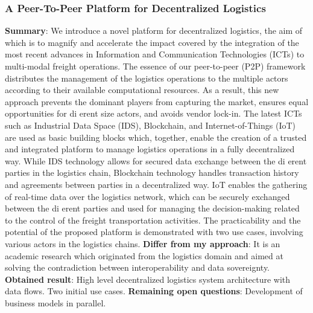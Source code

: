 \subsubsection{A Peer-To-Peer Platform for Decentralized Logistics \cite{peer-to-peerDecentralizedLogistics}}
\textbf{Summary}: We introduce a novel platform for decentralized logistics, the aim of which is to magnify and accelerate the impact covered by the integration of the most recent advances in Information and Communication Technologies (ICTs) to multi-modal freight operations. The essence of our peer-to-peer (P2P) framework distributes the management of the logistics operations to the multiple actors according to their available computational resources. As a result, this new approach prevents the dominant players from capturing the market, ensures equal opportunities for di erent size actors, and avoids vendor lock-in. The latest ICTs such as Industrial Data Space (IDS), Blockchain, and Internet-of-Things (IoT) are used as basic building blocks which, together, enable the creation of a trusted and integrated platform to manage logistics operations in a fully decentralized way. While IDS technology allows for secured data exchange between the di erent parties in the logistics chain, Blockchain technology handles transaction history and agreements between parties in a decentralized way. IoT enables the gathering of real-time data over the logistics network, which can be securely exchanged between the di erent parties and used for managing the decision-making related to the control of the freight transportation activities. The practicability and the potential of the proposed platform is demonstrated with two use cases, involving various actors in the logistics chains.\newline
\textbf{Differ from my approach}: It is an academic research which originated from the logistics domain and aimed at solving the contradiction between interoperability and data sovereignty.\newline
\textbf{Obtained result}: High level decentralized logistics system architecture with data flows. Two initial use cases.\newline
\textbf{Remaining open questions}: Development of business models in parallel.\newline
